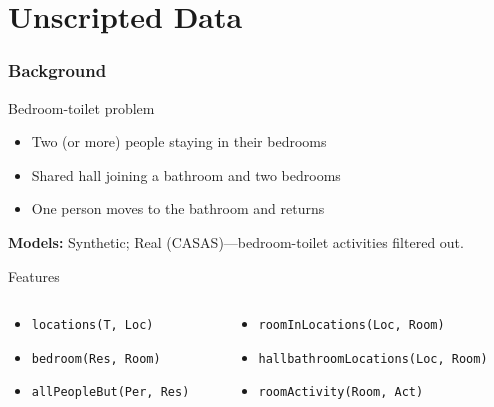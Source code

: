 \documentclass[10pt]{beamer}
\begin{document}
\section{Unscripted Data}
\begin{frame}
  \frametitle{Background}

  \begin{block}{Bedroom-toilet problem}
  \begin{itemize}
    \item Two (or more) people staying in their bedrooms
    \item Shared hall joining a bathroom and two bedrooms
    \item One person moves to the bathroom and returns
  \end{itemize}
  \end{block}

  \textbf{Models:} Synthetic; Real (CASAS)---bedroom-toilet activities filtered out.

  \begin{block}{Features}
  \begin{columns}

  \hspace*{1em}\begin{column}{5cm}
  \begin{itemize}
    \item \texttt{locations(T, Loc)}
    \item \texttt{bedroom(Res, Room)}
    \item \texttt{allPeopleBut(Per, Res)}
  \end{itemize}
  \end{column}

  \hspace*{-2.5em}\begin{column}{7cm}
  \begin{itemize}
    \item \texttt{roomInLocations(Loc, Room)}
    \item \texttt{hallbathroomLocations(Loc, Room)}
    \item \texttt{roomActivity(Room, Act)}
  \end{itemize}
  \end{column}

  \end{columns}
  \end{block}

\end{frame} 
\end{document}
